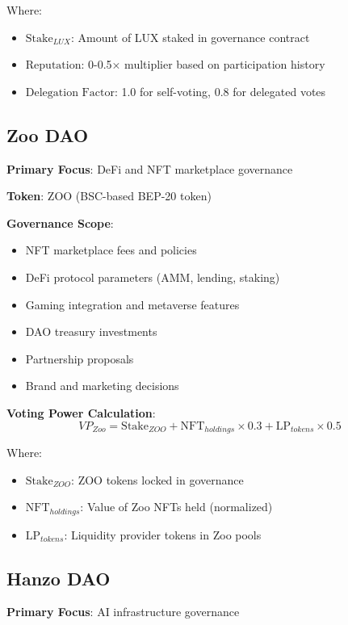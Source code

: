 \documentclass[11pt,a4paper]{article}
\begin{document}
Where:
\begin{itemize}
\item $\text{Stake}_{LUX}$: Amount of LUX staked in governance contract
\item $\text{Reputation}$: 0-0.5× multiplier based on participation history
\item $\text{Delegation Factor}$: 1.0 for self-voting, 0.8 for delegated votes
\end{itemize}

\subsection{Zoo DAO}

\textbf{Primary Focus}: DeFi and NFT marketplace governance

\textbf{Token}: ZOO (BSC-based BEP-20 token)

\textbf{Governance Scope}:
\begin{itemize}
\item NFT marketplace fees and policies
\item DeFi protocol parameters (AMM, lending, staking)
\item Gaming integration and metaverse features
\item DAO treasury investments
\item Partnership proposals
\item Brand and marketing decisions
\end{itemize}

\textbf{Voting Power Calculation}:
\begin{equation}
VP_{Zoo} = \text{Stake}_{ZOO} + \text{NFT}_{holdings} \times 0.3 + \text{LP}_{tokens} \times 0.5
\end{equation}

Where:
\begin{itemize}
\item $\text{Stake}_{ZOO}$: ZOO tokens locked in governance
\item $\text{NFT}_{holdings}$: Value of Zoo NFTs held (normalized)
\item $\text{LP}_{tokens}$: Liquidity provider tokens in Zoo pools
\end{itemize}

\subsection{Hanzo DAO}

\textbf{Primary Focus}: AI infrastructure governance
\end{document}
